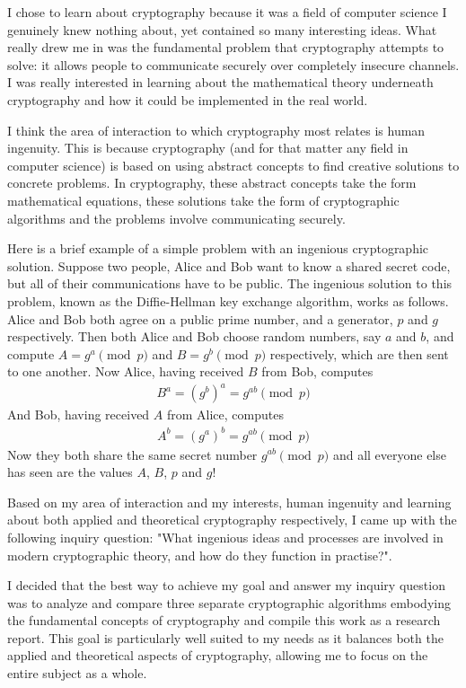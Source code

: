 \documentclass[12pt, a4paper, final]{report}
\begin{document}
I chose to learn about cryptography because it was a field of computer
science I genuinely knew nothing about, yet contained so many interesting
ideas. What really drew me in was the fundamental problem that cryptography
attempts to solve: it allows people to communicate securely over completely
insecure channels. I was really interested in learning about the mathematical
theory underneath cryptography and how it could be implemented in the real
world.

I think the area of interaction to which cryptography most relates is
human ingenuity. This is because cryptography (and for that matter any
field in computer science) is based on using abstract concepts to find
creative solutions to concrete problems. In cryptography, these abstract
concepts take the form mathematical equations, these solutions take the form
of cryptographic algorithms and the problems involve communicating securely.

Here is a brief example of a simple problem with an ingenious cryptographic
solution. Suppose two people, Alice and Bob want to know a shared secret
code, but all of their communications have to be public. The ingenious
solution to this problem, known as the Diffie-Hellman key exchange algorithm,
works as follows. Alice and Bob both agree on a public prime number, and
a generator, $p$ and $g$ respectively. Then both Alice and Bob
choose random numbers, say $a$ and $b$, and compute $A = g^a \pmod{p}$ and
$B = g^b \pmod{p}$ respectively, which are then sent to one another. Now
Alice, having received $B$ from Bob, computes
\begin{align*}
B^a = (g^b)^a = g^{ab} \pmod{p}
\end{align*}
And Bob, having received $A$ from Alice, computes
\begin{align*}
A^b = (g^a)^b = g^{ab} \pmod{p}
\end{align*}
Now they both share the same secret number $g^{ab} \pmod{p}$ and all
everyone else has seen are the values $A$, $B$, $p$ and $g$!

Based on my area of interaction and my interests, human ingenuity and
learning about both applied and theoretical cryptography respectively, I
came up with the following inquiry question: "What ingenious ideas and
processes are involved in modern cryptographic theory, and how do they
function in practise?".

I decided that the best way to achieve my goal and answer my inquiry
question was to analyze and compare three separate cryptographic algorithms
embodying the fundamental concepts of cryptography and compile this
work as a research report. This goal is particularly well suited to my
needs as it balances both the applied and theoretical aspects of cryptography,
allowing me to focus on the entire subject as a whole.
\end{document}
